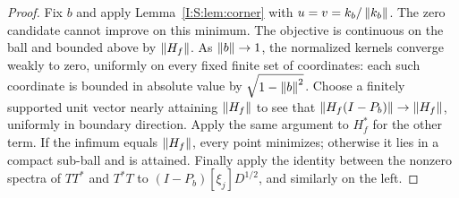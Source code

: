 \begin{proof}
Fix $b$ and apply Lemma~\ref{I:S:lem:corner} with $u=v=k_b/\left\lVert k_b\right\rVert$. The zero candidate cannot improve on this minimum. The objective is continuous on the ball and bounded above by $\left\lVert H_f\right\rVert$. As $\left\lVert b\right\rVert\to1$, the normalized kernels converge weakly to zero, uniformly on every fixed finite set of coordinates: each such coordinate is bounded in absolute value by $\sqrt{1-\left\lVert b\right\rVert^2}$. Choose a finitely supported unit vector nearly attaining $\left\lVert H_f\right\rVert$ to see that $\left\lVert H_f(I-P_b)\right\rVert\to\left\lVert H_f\right\rVert$, uniformly in boundary direction. Apply the same argument to $H_f^*$ for the other term. If the infimum equals $\left\lVert H_f\right\rVert$, every point minimizes; otherwise it lies in a compact sub-ball and is attained. Finally apply the identity between the nonzero spectra of $TT^*$ and $T^*T$ to $(I-P_b)[\xi_j]D^{1/2}$, and similarly on the left.
\end{proof}
